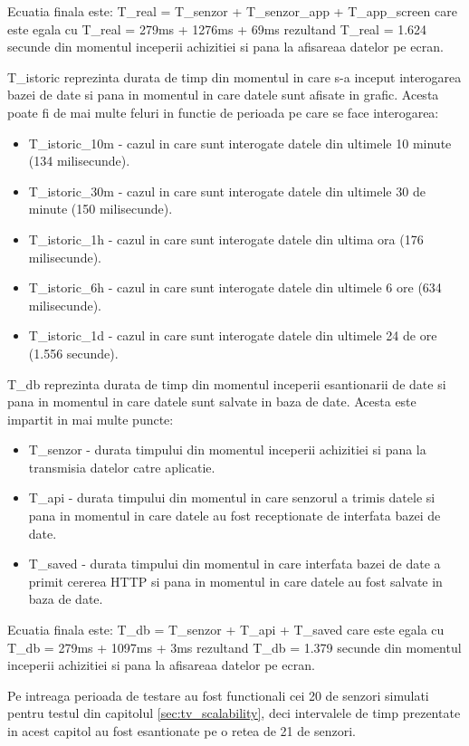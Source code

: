 Ecuatia finala este: T\_real = T\_senzor + T\_senzor\_app + T\_app\_screen care este egala cu T\_real = 279ms + 1276ms + 69ms rezultand T\_real = 1.624 secunde 
din momentul inceperii achizitiei si pana la afisareaa datelor pe ecran.

T\_istoric reprezinta durata de timp din momentul in care s-a inceput interogarea bazei de date si pana in momentul in care datele sunt afisate in grafic. Acesta 
poate fi de mai multe feluri in functie de perioada pe care se face interogarea:
\begin{itemize}
	\item T\_istoric\_10m - cazul in care sunt interogate datele din ultimele 10 minute (134 milisecunde).
	\item T\_istoric\_30m - cazul in care sunt interogate datele din ultimele 30 de minute (150 milisecunde).
	\item T\_istoric\_1h - cazul in care sunt interogate datele din ultima ora (176 milisecunde).
	\item T\_istoric\_6h - cazul in care sunt interogate datele din ultimele 6 ore (634 milisecunde).
	\item T\_istoric\_1d - cazul in care sunt interogate datele din ultimele 24 de ore (1.556 secunde).
\end{itemize}

T\_db reprezinta durata de timp din momentul inceperii esantionarii de date si pana in momentul in care datele sunt salvate in baza de date. Acesta este impartit 
in mai multe puncte:
\begin{itemize}
    \item T\_senzor - durata timpului din momentul inceperii achizitiei si pana la transmisia datelor catre aplicatie.
	\item T\_api - durata timpului din momentul in care senzorul a trimis datele si pana in momentul in care datele au fost receptionate de interfata bazei de date.
	\item T\_saved - durata timpului din momentul in care interfata bazei de date a primit cererea HTTP si pana in momentul in care datele au fost salvate in baza 
    de date.
\end{itemize}

Ecuatia finala este: T\_db = T\_senzor + T\_api + T\_saved care este egala cu T\_db = 279ms + 1097ms + 3ms rezultand T\_db = 1.379 secunde 
din momentul inceperii achizitiei si pana la afisareaa datelor pe ecran.

Pe intreaga perioada de testare au fost functionali cei 20 de senzori simulati pentru testul din capitolul \ref{sec:tv_scalability}, deci intervalele de timp 
prezentate in acest capitol au fost esantionate pe o retea de 21 de senzori.
